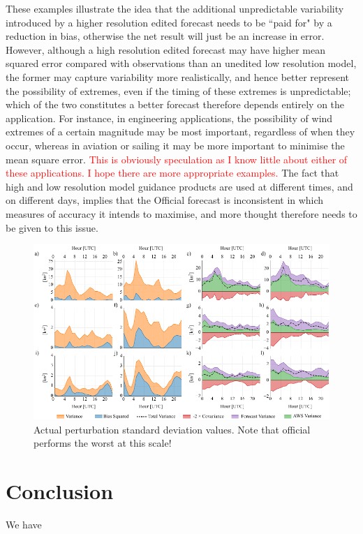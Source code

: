 \documentclass{ametsoc}
\begin{document}
These examples illustrate the idea that the additional unpredictable variability introduced by a higher resolution edited forecast needs to be ``paid for" by a reduction in bias, otherwise the net result will just be an increase in error. However, although a high resolution edited forecast may have higher mean squared error compared with observations than an unedited low resolution model, the former may capture variability more realistically, and hence better represent the possibility of extremes, even if the timing of these extremes is unpredictable; which of the two constitutes a better forecast therefore depends entirely on the application. For instance, in engineering applications, the possibility of wind extremes of a certain magnitude may be most important, regardless of when they occur, whereas in aviation or sailing it may be more important to minimise the mean square error. \textcolor{red}{This is obviously speculation as I know little about either of these applications. I hope there are more appropriate examples.} The fact that high and low resolution model guidance products are used at different times, and on different days, implies that the Official forecast is inconsistent in which measures of accuracy it intends to maximise, and more thought therefore needs to be given to this issue.  

\begin{figure}
\centering
\includegraphics[width=39pc]{error_decomp_v.pdf}
\caption{Actual perturbation standard deviation values. Note that official performs the worst at this scale!}
\label{Fig:error_decomp_v}
\end{figure}

\section{Conclusion}
\label{Sec:Conclusion}
We have



\end{document}
